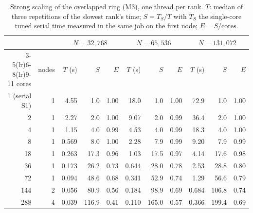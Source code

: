 \begin{table}[t]\centering\small\setlength{\tabcolsep}{4.2pt}
\begin{tabular}{@{}rrrrrrrrrrr@{}}
\toprule
 & & \multicolumn{3}{c}{$N=32{,}768$} & \multicolumn{3}{c}{$N=65{,}536$} & \multicolumn{3}{c}{$N=131{,}072$}\\
\cmidrule(lr){3-5}\cmidrule(lr){6-8}\cmidrule(lr){9-11}
cores & nodes & $T$ (s) & $S$ & $E$ & $T$ (s) & $S$ & $E$ & $T$ (s) & $S$ & $E$\\
\midrule
1 (serial S1) & 1 & 4.55 & 1.0 & 1.00 & 18.0 & 1.0 & 1.00 & 72.9 & 1.0 & 1.00\\
2 & 1 & 2.27 & 2.0 & 1.00 & 9.07 & 2.0 & 0.99 & 36.4 & 2.0 & 1.00\\
4 & 1 & 1.15 & 4.0 & 0.99 & 4.53 & 4.0 & 0.99 & 18.3 & 4.0 & 1.00\\
8 & 1 & 0.569 & 8.0 & 1.00 & 2.28 & 7.9 & 0.99 & 9.20 & 7.9 & 0.99\\
18 & 1 & 0.263 & 17.3 & 0.96 & 1.03 & 17.5 & 0.97 & 4.14 & 17.6 & 0.98\\
36 & 1 & 0.173 & 26.2 & 0.73 & 0.644 & 28.0 & 0.78 & 2.53 & 28.8 & 0.80\\
72 & 1 & 0.094 & 48.6 & 0.68 & 0.341 & 52.9 & 0.74 & 1.29 & 56.6 & 0.79\\
144 & 2 & 0.056 & 80.9 & 0.56 & 0.184 & 98.9 & 0.69 & 0.684 & 106.8 & 0.74\\
288 & 4 & 0.039 & 116.9 & 0.41 & 0.110 & 165.0 & 0.57 & 0.366 & 199.4 & 0.69\\
\bottomrule
\end{tabular}
\caption{Strong scaling of the overlapped ring (M3), one thread per rank. $T$: median of three repetitions of the slowest rank's time; $S=T_S/T$ with $T_S$ the single-core tuned serial time measured in the same job on the first node; $E=S/\text{cores}$.}
\label{tab:strong}
\end{table}
